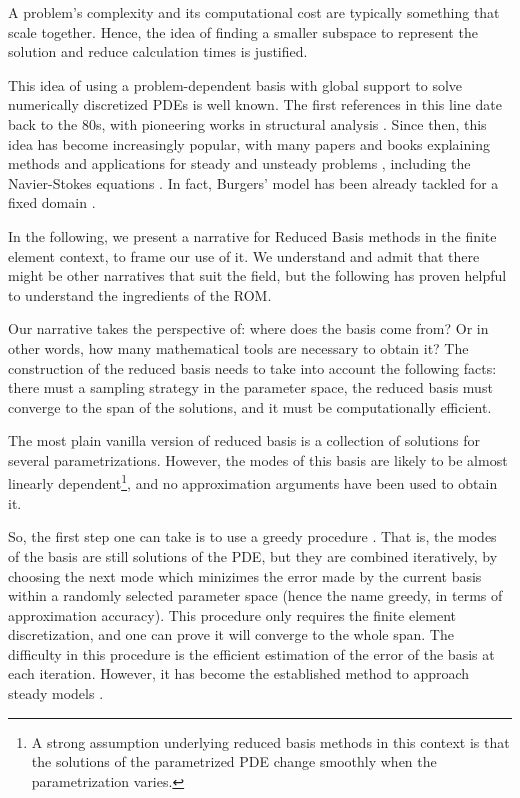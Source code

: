 A problem's complexity and its computational cost
are typically something that scale together.
Hence, the idea of finding a smaller subspace to represent
the solution and reduce calculation times is justified.

This idea of using a problem-dependent basis with global support 
to solve numerically discretized PDEs
is well known.
The first references in this line date back to the 80s, 
with pioneering works in structural analysis \cite{1978firstRBStructuralAnalysis}.
Since then, this idea has become increasingly popular,
with many papers and books explaining methods and applications for steady and unsteady problems
\cite{Rozza2008, 
2005_aPosterioriErrorBoundsReducedBasisApproximationsParametrizedParabolicPde_Grepl,
2009_reducedBasisMethodsAPosterioriErrorEstimatorsHeatTransferProblems_Rozza,
2016_CertifiedReducedBasisMethodsParametrizedPDE_Hesthaven,
Quarteroni2016,
2017_modelReductionAndApproximation,
benner2017_book},
including the Navier-Stokes equations 
\cite{navierStokesReducedBasis}.
In fact, Burgers' model has been already tackled for a fixed domain
\cite{Nguyen2009}.

In the following,
we present a narrative for Reduced Basis methods in the finite element context,
to frame our use of it.
We understand and admit that there might be other narratives that suit the field,
but the following has proven helpful to understand the ingredients of the ROM.

Our narrative takes the perspective of: where does the basis come from?
Or in other words,
how many mathematical tools are necessary to obtain it?
The construction of the reduced basis needs to take into account the following facts:
there must a sampling strategy in the parameter space,
the reduced basis must converge to the span of the solutions,
and it must be computationally efficient.

The most plain vanilla version of reduced basis is 
a collection of solutions for several parametrizations.
However, the modes of this basis are likely to be almost linearly dependent\footnote{
    A strong assumption underlying reduced basis methods in this context
    is that the solutions of the parametrized PDE
    change smoothly when the parametrization varies.
},
and no approximation arguments have been used to obtain it.

So, the first step one can take is to use a greedy procedure
\cite{Buffa2012APC, Veroy2003}.
That is, the modes of the basis are still solutions of the PDE, 
but they are combined iteratively,
by choosing the next mode which minizimes 
the error made by the current basis within a randomly selected parameter space
(hence the name greedy, in terms of approximation accuracy).
This procedure only requires the finite element discretization,
and one can prove it will converge to the whole span.
The difficulty in this procedure 
is the efficient estimation of the error
of the basis at each iteration.
However, it has become the established method to approach steady models \cite{Haasdonk2013}.

